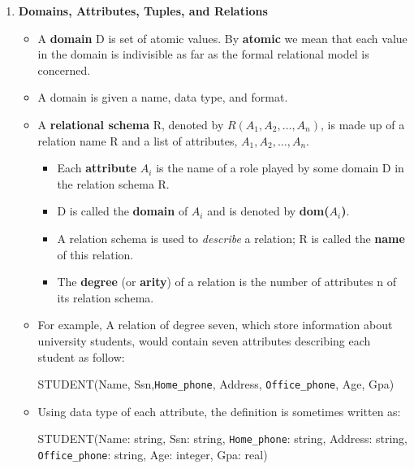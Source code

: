 \documentclass[10pt]{article}
\begin{document}
\begin{enumerate}
	\item \textbf{Domains, Attributes, Tuples, and Relations}
	\begin{itemize}
		\item A \textbf{domain} D is set of atomic values. By \textbf{atomic} we mean that each value in the domain is indivisible as far as the formal relational model is concerned.
		\item A domain is given a name, data type, and format.
		\item A \textbf{relational schema} R, denoted by $R(A_1, A_2, \ldots, A_n)$, is made up of a relation name R and a list of attributes, $A_1, A_2, \ldots, A_n$.
		\begin{itemize}
			\item Each \textbf{attribute} $A_i$ is the name of a role played by some domain D in the relation schema R.
			\item D is called the \textbf{domain} of $A_{i}$ and is denoted by \textbf{dom($A_i$)}.
			\item A relation schema is used to \textit{describe} a relation; R is called the \textbf{name} of this relation.
			\item The \textbf{degree} (or \textbf{arity}) of a relation is the number of attributes n of its relation schema.
		\end{itemize}
		\item For example, A relation of degree seven, which store information about university students, would contain seven attributes describing each student as follow: \\
		\begin{center}
		STUDENT(Name, Ssn,\texttt{Home\_phone}, Address, \texttt{Office\_phone}, Age, Gpa)
		\end{center}
		\item Using data type of each attribute, the definition is sometimes written as:
		\begin{center}
		STUDENT(Name: string, Ssn: string, \texttt{Home\_phone}: string, Address: string, \texttt{Office\_phone}: string, Age: integer, Gpa: real)
		\end{center}


\end{itemize}
\end{enumerate}
\end{document}
